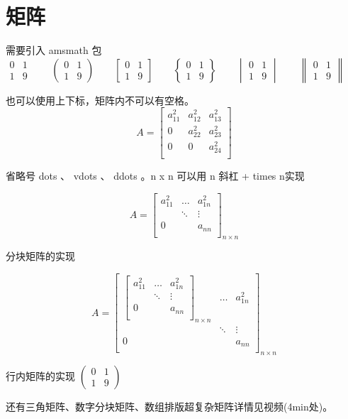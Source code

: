 \documentclass[UTF8]{article}
\date{\today}
\begin{document}
	\section{矩阵}
	需要引入 amsmath 包
	\[
	\begin{matrix}
		0 & 1\\
		1　& 9 
	\end{matrix} \qquad 
	\begin{pmatrix}
	0 & 1\\
	1　& 9 
	\end{pmatrix}\qquad
	\begin{bmatrix}
	0 & 1\\
	1　& 9 
	\end{bmatrix}\qquad
	\begin{Bmatrix}
	0 & 1\\
	1　& 9 
	\end{Bmatrix}\qquad
	\begin{vmatrix}
	0 & 1\\
	1　& 9 
	\end{vmatrix}\qquad
	\begin{Vmatrix}
		0 & 1\\
		1　& 9 
	\end{Vmatrix}\qquad
	\]
	
	也可以使用上下标，矩阵内不可以有空格。
	\[
	A = \begin{bmatrix}
		a_{11}^2 & a_{12} ^2& a_{13}^2 \\
		0 & a_{22}^2 & a_{23}^2 \\
		0 & 0 & a_{24}^2 \\
	\end{bmatrix}
	\]
	
	省略号 dots 、 vdots 、 ddots 。n x n 可以用 n 斜杠 + times n实现
	
	\[
	A = \begin{bmatrix}
	a_{11}^2 & \dots & a_{1n}^2 \\
	 & \ddots & \vdots \\
	0 &  & a_{nn} \\
	\end{bmatrix}_{n \times n}
	\]
	
	分块矩阵的实现
	
		\[
	A = \begin{bmatrix}
	\begin{bmatrix}
	a_{11}^2 & \dots & a_{1n}^2 \\
	& \ddots & \vdots \\
	0 &  & a_{nn} \\
	\end{bmatrix}_{n \times n} & \dots & a_{1n}^2 \\
	& \ddots & \vdots \\
	0 &  & a_{nn} \\
	\end{bmatrix}_{n \times n}
	\]
	
	行内矩阵的实现
	\begin{math}
	\left(
		\begin{smallmatrix}
			0 & 1\\
			1　& 9 
		\end{smallmatrix}
	\right)%
	\end{math}

	
	还有三角矩阵、数字分块矩阵、数组排版超复杂矩阵详情见视频(4min处)。
	
	
	
	
\end{document}
